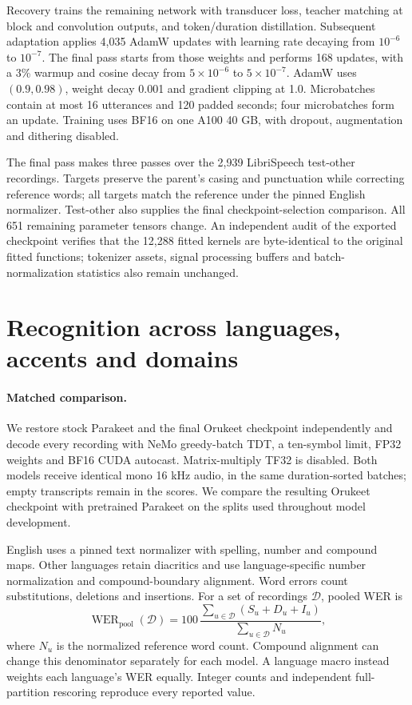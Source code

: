\documentclass{article}
\begin{document}
Recovery trains the remaining network with transducer loss, teacher matching
at block and convolution outputs, and token/duration distillation. Subsequent
adaptation applies 4,035 AdamW updates with learning rate decaying from
$10^{-6}$ to $10^{-7}$. The final pass starts from those weights and performs
168 updates, with a 3\% warmup and cosine decay from $5\times10^{-6}$ to
$5\times10^{-7}$. AdamW uses $(0.9,0.98)$, weight decay 0.001 and gradient
clipping at 1.0. Microbatches contain at most 16 utterances and 120 padded
seconds; four microbatches form an update. Training uses BF16 on one A100
40 GB, with dropout, augmentation and dithering disabled.

The final pass makes three passes over the 2,939 LibriSpeech test-other
recordings. Targets preserve the parent's casing and punctuation while
correcting reference words; all targets match the reference under the pinned
English normalizer. Test-other also supplies the final checkpoint-selection
comparison. All 651 remaining parameter tensors change. An independent audit
of the exported checkpoint verifies that the 12,288 fitted kernels are
byte-identical to the original fitted functions; tokenizer assets, signal
processing buffers and batch-normalization statistics also remain unchanged.

\section{Recognition across languages, accents and domains}
\paragraph{Matched comparison.}
We restore stock Parakeet and the final Orukeet checkpoint independently and
decode every recording with NeMo greedy-batch TDT, a ten-symbol limit, FP32
weights and BF16 CUDA autocast. Matrix-multiply TF32 is disabled. Both models
receive identical mono 16 kHz audio, in the same duration-sorted batches;
empty transcripts remain in the scores. We compare the resulting Orukeet
checkpoint with pretrained Parakeet on the splits used throughout model
development.

English uses a pinned text normalizer with spelling, number and compound
maps. Other languages retain diacritics and use language-specific number
normalization and compound-boundary alignment. Word errors count substitutions,
deletions and insertions. For a set of recordings $\mathcal D$, pooled WER is
\begin{equation}
 \operatorname{WER}_{\mathrm{pool}}(\mathcal D)
 =100\,\frac{\sum_{u\in\mathcal D}(S_u+D_u+I_u)}
                 {\sum_{u\in\mathcal D}N_u},
 \label{eq:pooled}
\end{equation}
where $N_u$ is the normalized reference word count. Compound alignment can
change this denominator separately for each model. A language macro instead
weights each language's WER equally. Integer counts and independent
full-partition rescoring reproduce every reported value.
\end{document}
